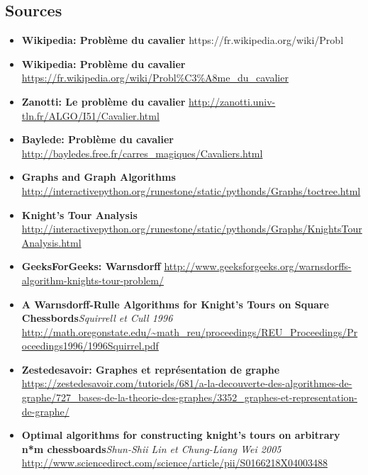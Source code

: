 \subsection{Sources}
\begin{itemize}
  \item \textbf{Wikipedia: Problème du cavalier} https://fr.wikipedia.org/wiki/Probl%
    \item \textbf{Wikipedia: Problème du cavalier} \url{https://fr.wikipedia.org/wiki/Probl%C3%A8me_du_cavalier}
	\item \textbf{Zanotti: Le problème du cavalier} \url{http://zanotti.univ-tln.fr/ALGO/I51/Cavalier.html}
	\item \textbf{Baylede: Problème du cavalier} \url{http://bayledes.free.fr/carres_magiques/Cavaliers.html}
	\item \textbf{Graphs and Graph Algorithms} \url{http://interactivepython.org/runestone/static/pythonds/Graphs/toctree.html}
	\item \textbf{Knight’s Tour Analysis} \url{http://interactivepython.org/runestone/static/pythonds/Graphs/KnightsTourAnalysis.html}
	\item \textbf{GeeksForGeeks: Warnsdorff} \url{http://www.geeksforgeeks.org/warnsdorffs-algorithm-knights-tour-problem/}
	\item \textbf{A Warnsdorff-Rulle Algorithms for Knight’s Tours on Square Chessbords}\textit{Squirrell et Cull 1996} \url{http://math.oregonstate.edu/~math_reu/proceedings/REU_Proceedings/Proceedings1996/1996Squirrel.pdf}
	\item \textbf{Zestedesavoir: Graphes et représentation de graphe} \url{https://zestedesavoir.com/tutoriels/681/a-la-decouverte-des-algorithmes-de-graphe/727_bases-de-la-theorie-des-graphes/3352_graphes-et-representation-de-graphe/}
	\item \textbf{Optimal algorithms for constructing knight's tours on arbitrary n*m chessboards}\textit{Shun-Shii Lin et Chung-Liang Wei 2005} \url{http://www.sciencedirect.com/science/article/pii/S0166218X04003488}

\end{itemize}
